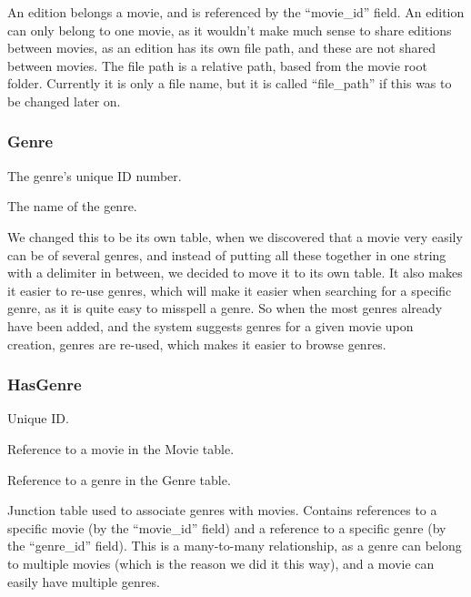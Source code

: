 An edition belongs a movie, and is referenced by the ``movie\_id'' field. An edition can only belong to one movie, as it wouldn't make much sense to share editions between movies, as an edition has its own file path, and these are not shared between movies. The file path is a relative path, based from the movie root folder. Currently it is only a file name, but it is called ``file\_path'' if this was to be changed later on.

\subsubsection{Genre}
\label{Design_Database_Tables_Genre}

\begin{my_description}
\item[genre\_id] The genre's unique ID number.
\item[name] The name of the genre.
\end{my_description}

We changed this to be its own table, when we discovered that a movie very easily can be of several genres, and instead of putting all these together in one string with a delimiter in between, we decided to move it to its own table. It also makes it easier to re-use genres, which will make it easier when searching for a specific genre, as it is quite easy to misspell a genre. So when the most genres already have been added, and the system suggests genres for a given movie upon creation, genres are re-used, which makes it easier to browse genres.

\subsubsection{HasGenre}
\label{Design_Database_Tables_HasGenre}

\begin{my_description}
\item[hasgenre\_id] Unique ID.
\item[movie\_id] Reference to a movie in the Movie table.
\item[genre\_id] Reference to a genre in the Genre table.
\end{my_description}

Junction table used to associate genres with movies. Contains references to a specific movie (by the ``movie\_id'' field) and a reference to a specific genre (by the ``genre\_id'' field). This is a many-to-many relationship, as a genre can belong to multiple movies (which is the reason we did it this way), and a movie can easily have multiple genres.

